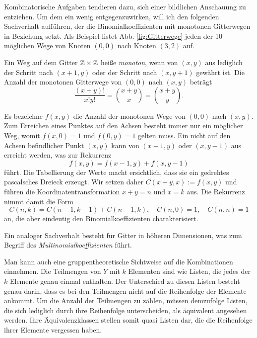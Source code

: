 \noindent
Kombinatorische Aufgaben tendieren dazu, sich einer bildlichen
Anschauung zu entziehen. Um dem ein wenig entgegenzuwirken, will
ich den folgenden Sachverhalt aufführen, der die Binomialkoeffizienten
mit monotonen Gitterwegen in Beziehung setzt. Als Beispiel listet
Abb. \ref{fig:Gitterwege} jeden der 10 möglichen Wege von Knoten
$(0,0)$ nach Knoten $(3,2)$ auf.

\begin{Satz}
Ein Weg auf dem Gitter $\mathbb Z\times\mathbb Z$ heiße \emph{monoton}, wenn von $(x,y)$
aus lediglich der Schritt nach $(x+1,y)$ oder der Schritt nach $(x,y+1)$
gewährt ist. Die Anzahl der monotonen Gitterwege von $(0,0)$ nach
$(x,y)$ beträgt
\[\frac{(x+y)!}{x!y!} = \binom{x+y}{x} = \binom{x+y}{y}.\]
\end{Satz}
\begin{Beweis}
Es bezeichne $f(x,y)$ die Anzahl der monotonen Wege von $(0,0)$ nach
$(x,y)$. Zum Erreichen eines Punktes auf den Achsen besteht immer
nur ein möglicher Weg, womit $f(x,0)=1$ und $f(0,y)=1$ gelten muss. Ein
nicht auf den Achsen befindlicher Punkt $(x,y)$ kann von $(x-1,y)$ oder
$(x,y-1)$ aus erreicht werden, was zur Rekurrenz
\[f(x,y) = f(x-1,y) + f(x,y-1)\]
führt. Die Tabellierung der Werte macht ersichtlich, dass sie
ein gedrehtes pascalsches Dreieck erzeugt. Wir setzen daher
$C(x+y,x):=f(x,y)$ und führen die Koordinatentransformation $x+y=n$
und $x=k$ aus. Die Rekurrenz nimmt damit die Form
\[C(n,k) = C(n-1,k-1) + C(n-1,k),\quad C(n,0)=1,\quad C(n,n)=1\]
an, die aber eindeutig den Binomialkoeffizienten charakterisiert.\,\qedsymbol
\end{Beweis}

\noindent
Ein analoger Sachverhalt besteht für Gitter in höheren Dimensionen,
was zum Begriff des \emph{Multinomialkoeffizienten} führt.

Man kann auch eine gruppentheoretische Sichtweise auf die Kombinationen
einnehmen. Die Teilmengen von $Y$ mit $k$ Elementen sind wie Listen, die
jedes der $k$ Elemente genau einmal enthalten. Der Unterschied zu diesen
Listen besteht genau darin, dass es bei den Teilmengen nicht auf die
Reihenfolge der Elemente ankommt. Um die Anzahl der Teilmengen zu
zählen, müssen demzufolge Listen, die sich lediglich durch ihre
Reihenfolge unterscheiden, als äquivalent angesehen werden. Ihre
Äquivalenzklassen stellen somit quasi Listen dar, die die Reihenfolge
ihrer Elemente vergessen haben.

